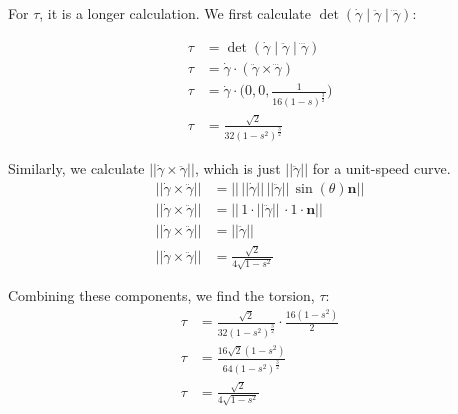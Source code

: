 \documentclass{article}
\begin{document}
\begin{flushleft}
	For $\tau$, it is a longer calculation. We first calculate $\det({\dot{\gamma}} \mid \ddot{\gamma} \mid \dddot{\gamma})$: 

	\begin{align*}
		\tau &= \det({\dot{\gamma}} \mid \ddot{\gamma} \mid \dddot{\gamma}) \\ 
		\tau &= \dot{\gamma} \cdot (\ddot{\gamma} \times \dddot{\gamma}) \\ 
		\tau &= \dot{\gamma} \cdot \biggl(0, 0, \frac{1}{16(1-s)^\frac{3}{2}}\biggr) \\ 
		\tau &= \frac{\sqrt{2}}{32(1-s^2)^\frac{3}{2}} 
	\end{align*}
	
	Similarly, we calculate $||\dot{\gamma} \times \ddot{\gamma}||$, which is just $||\ddot{\gamma}||$ for a unit-speed curve.
	\begin{align*}
		||\dot{\gamma} \times \ddot{\gamma}|| &= ||\, ||\dot{\gamma}|| \, ||\ddot{\gamma}|| \, \sin(\theta)\mathbf{n}|| \\ 
		||\dot{\gamma} \times \ddot{\gamma}|| &= ||\, 1 \cdot ||\ddot{\gamma}|| \, \cdot 1 \cdot \mathbf{n}|| \\ 
		||\dot{\gamma} \times \ddot{\gamma}|| &= ||\ddot{\gamma}|| \\ 
		||\dot{\gamma} \times \ddot{\gamma}|| &= \frac{\sqrt{2}}{4\sqrt{1-s^2}}
	\end{align*}

	Combining these components, we find the torsion, $\tau$:
	\begin{align*}
		\tau &= \frac{\sqrt{2}}{32(1-s^2)^{\frac{3}{2}}} \cdot \frac{16(1-s^2)}{2} \\
		\tau &= \frac{16\sqrt{2}(1-s^2)}{64(1-s^2)^\frac{3}{2}} \\ 
		\tau &= \frac{\sqrt{2}}{4\sqrt{1-s^2}} 
	\end{align*}
    \end{flushleft}
\end{document}
